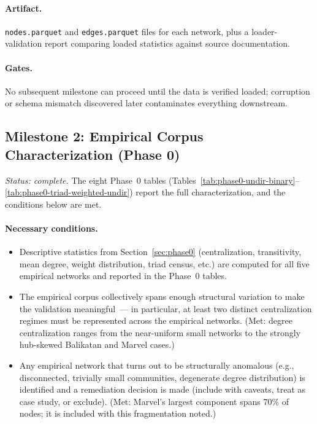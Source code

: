\documentclass[11pt]{article}
\begin{document}
\paragraph{Artifact.} \texttt{nodes.parquet} and \texttt{edges.parquet} files for each network, plus a loader-validation report comparing loaded statistics against source documentation.

\paragraph{Gates.} No subsequent milestone can proceed until the data is verified loaded; corruption or schema mismatch discovered later contaminates everything downstream.

\subsection*{Milestone 2: Empirical Corpus Characterization (Phase 0)}

\emph{Status: complete.} The eight Phase~0 tables (Tables~\ref{tab:phase0-undir-binary}--\ref{tab:phase0-triad-weighted-undir}) report the full characterization, and the conditions below are met.

\paragraph{Necessary conditions.}
\begin{itemize}[leftmargin=*, itemsep=2pt]
  \item Descriptive statistics from Section~\ref{sec:phase0} (centralization, transitivity, mean degree, weight distribution, triad census, etc.) are computed for all five empirical networks and reported in the Phase~0 tables.
  \item The empirical corpus collectively spans enough structural variation to make the validation meaningful~--- in particular, at least two distinct centralization regimes must be represented across the empirical networks. (Met: degree centralization ranges from the near-uniform small networks to the strongly hub-skewed Balikatan and Marvel cases.)
  \item Any empirical network that turns out to be structurally anomalous (e.g., disconnected, trivially small communities, degenerate degree distribution) is identified and a remediation decision is made (include with caveats, treat as case study, or exclude). (Met: Marvel's largest component spans 70\% of nodes; it is included with this fragmentation noted.)
\end{itemize}
\end{document}
